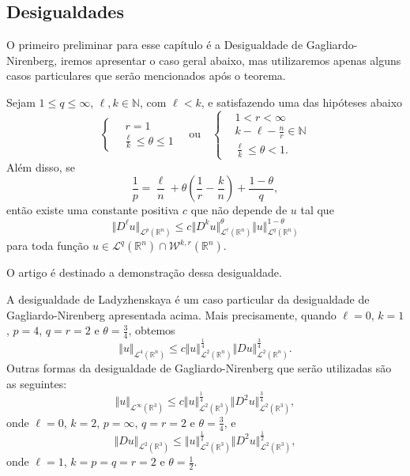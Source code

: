 \documentclass[a4paper, 11pt]{book}
\theoremstyle{definition}
\newcommand{\bN}{\mathbb{N}}
\newcommand{\bR}{\mathbb{R}}
\newcommand{\cL}{\mathcal{L}}
\newcommand{\cW}{\mathcal{W}}
\begin{document}
\subsection{Desigualdades}

O primeiro preliminar para esse capítulo é a Desigualdade de Gagliardo-Nirenberg, iremos apresentar o caso geral abaixo, mas utilizaremos apenas alguns casos particulares que serão mencionados após o teorema.
\begin{tbox}
    Sejam $1 \leqslant q \leqslant \infty$, $\ell,k \in \bN$, com $\ell < k$, e satisfazendo uma das hipóteses abaixo
    \[
        \left\{ \begin{aligned}
            &\,r = 1\\
            &\frac{\ell}{k} \leqslant \theta \leqslant 1
        \end{aligned} \right.
        \quad
        \text{ou}
        \quad
        \left\{ \begin{aligned}
            &1 < r < \infty\\[4pt]
            &k - \ell - \frac{n}{r} \in \bN\\
            &\frac{\ell}{k} \leqslant \theta < 1.
        \end{aligned} \right.
    \]
    Além disso, se
    \[
        \frac{1}{p} = \frac{\ell}{n} + \theta \left( \frac{1}{r} - \frac{k}{n} \right) + \frac{1 - \theta}{q},
    \]
    então existe uma constante positiva $c$ que não depende de $u$ tal que
    \[
        \Vert D^\ell u \Vert_{\cL^p(\bR^n)} \leqslant c \Vert D^k u \Vert_{\cL^r(\bR^n)}^\theta \Vert u \Vert_{\cL^q(\bR^n)}^{1-\theta}
    \]
    para toda função $u \in \cL^q(\bR^n) \cap \cW^{k,r}(\bR^n)$.  
\end{tbox}
\begin{prf}
    O artigo \cite{fiorenza-gns} é destinado a demonstração dessa desigualdade.
\end{prf}

A desigualdade de Ladyzhenskaya é um caso particular da desigualdade de Gagliardo-Nirenberg apresentada acima. Mais precisamente, quando $\ell = 0$, $k = 1$, $p = 4$, $q = r = 2$ e $\theta = \frac{3}{4}$, obtemos
\begin{equation} \label{eq:gagliardoL4}
    \Vert u \Vert_{\cL^4(\bR^n)} \leqslant c \Vert u \Vert_{\cL^2(\bR^n)}^{\frac{1}{4}} \Vert Du \Vert_{\cL^2(\bR^n)}^{\frac{3}{4}}.
\end{equation}
Outras formas da desigualdade de Gagliardo-Nirenberg que serão utilizadas são as seguintes:
\begin{equation} \label{eq:gagliardoinf}
    \Vert u \Vert_{\cL^\infty(\bR^3)} \leqslant c \Vert u \Vert_{\cL^2(\bR^3)}^{\frac{1}{4}} \Vert D^2 u \Vert_{\cL^2(\bR^3)}^{\frac{3}{4}},
\end{equation}
onde $\ell = 0$, $k = 2$, $p = \infty$, $q = r = 2$ e $\theta = \frac{3}{4}$, e
\begin{equation} \label{eq:gagliardoDu}
    \Vert Du \Vert_{\cL^2(\bR^3)} \leqslant \Vert u \Vert_{\cL^2(\bR^3)}^{\frac{1}{2}} \Vert D^2 u \Vert_{\cL^2(\bR^3)}^{\frac{1}{2}},
\end{equation}
onde $\ell = 1$, $k = p = q = r = 2$ e $\theta = \frac{1}{2}$.
\end{document}
